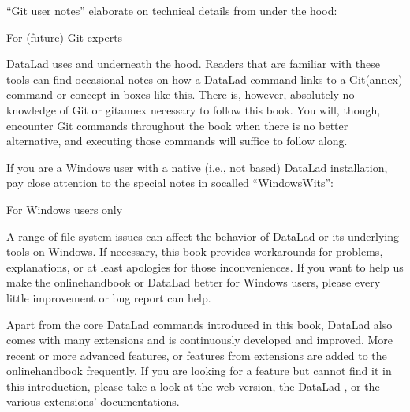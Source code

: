 \sphinxAtStartPar
“Git user notes” elaborate on technical details from under the hood:
\begin{gitusernote}[before title={\thetcbcounter\ }, check odd page=true]{For (future) Git experts}

\sphinxAtStartPar
DataLad uses {\hyperref[\detokenize{glossary:term-Git}]{}} and {\hyperref[\detokenize{glossary:term-git-annex}]{}} underneath the hood. Readers that
are familiar with these tools can find occasional notes on how a DataLad   command links to a Git(\sphinxhyphen{}annex) command or concept in boxes like this.
There is, however, absolutely no knowledge of Git or git\sphinxhyphen{}annex necessary
to follow this book. You will, though, encounter Git commands throughout
the book when there is no better alternative, and executing those commands will
suffice to follow along.


\end{gitusernote}

\sphinxAtStartPar
If you are a Windows user with a native (i.e., not \sphinxhyphen{}based) DataLad installation, pay close attention to the special notes in so\sphinxhyphen{}called “Windows\sphinxhyphen{}Wits”:
\begin{windowswit}[before title={\thetcbcounter\ }, check odd page=true]{For Windows users only}

\sphinxAtStartPar
A range of file system issues can affect the behavior of DataLad or its underlying tools on Windows.
If necessary, this book provides workarounds for problems, explanations, or at least apologies for those inconveniences.
If you want to help us make the online\sphinxhyphen{}handbook or DataLad better for Windows users, please  \textendash{} every little improvement or bug report can help.


\end{windowswit}

\sphinxAtStartPar
Apart from the core DataLad commands introduced in this book, DataLad also comes with many extensions and is continuously developed and improved.
More recent or more advanced features, or features from extensions are added to the online\sphinxhyphen{}handbook frequently.
If you are looking for a feature but cannot find it in this introduction, please take a look at the web version, the DataLad , or the various extensions’ documentations.


